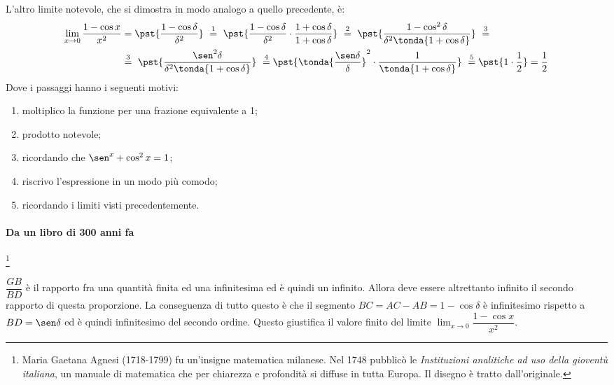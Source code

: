 L'altro limite notevole, che si dimostra in modo analogo a quello 
precedente, è:
\begin{align*}
 \lim_{x \rightarrow 0} \frac{1-\cos x}{x^2} &=
 \pst{\frac{1-\cos \delta}{\delta^2}}
~ \stackrel{1}{=} ~  
 \pst{\frac{1-\cos \delta}{\delta^2} \cdot 
      \frac{1+\cos \delta}{1+\cos \delta}}
~ \stackrel{2}{=} ~ 
 \pst{\frac{1-\cos^2 \delta}{\delta^2 \tonda{1+\cos \delta}}}~ 
\stackrel{3}{=} \\
& \stackrel{3}{=} ~
 \pst{\frac{\sen^2 \delta}{\delta^2 \tonda{1+\cos \delta}}}
~ \stackrel{4}{=}
 \pst{\tonda{\frac{\sen \delta}{\delta}}^2 \cdot 
      \frac{1}{\tonda{1+\cos \delta}}}
~ \stackrel{5}{=}
 \pst{1 \cdot \frac{1}{2}} = \frac{1}{2}
\end{align*}
Dove i passaggi hanno i seguenti motivi:
\begin{enumerate} [nosep]
 \item moltiplico la funzione per una frazione equivalente a 1;
 \item prodotto notevole;
 \item ricordando che \(\sen^x + \cos^2 x = 1\);
 \item riscrivo l'espressione in un modo più comodo;
 \item ricordando i limiti visti precedentemente.
\end{enumerate}

\newpage
\paragraph{Da un libro di 300 anni fa}\hspace{-3mm}\footnote{
Maria Gaetana Agnesi (1718-1799) fu un'insigne matematica milanese. Nel 1748 
pubblicò le \emph{Instituzioni analitiche ad uso della gioventù italiana}, un 
manuale di matematica che per chiarezza e profondità si diffuse in tutta 
Europa. 
Il disegno è tratto dall'originale.}~

\(\dfrac{GB}{BD}\) è il rapporto fra una quantità finita ed una infinitesima 
ed è quindi un infinito. Allora deve essere altrettanto infinito il secondo 
rapporto di questa proporzione. La conseguenza di tutto questo è che il 
segmento \(BC= AC-AB=1-\cos\delta\) è infinitesimo rispetto a 
\(BD=\sen \delta\) ed è quindi infinitesimo del secondo ordine. Questo 
giustifica il valore finito del limite 
\(\lim_{x \rightarrow 0} \dfrac{1-\cos x}{x^2}\).


